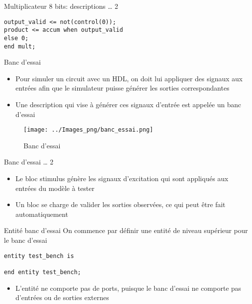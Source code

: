 \documentclass[presentation]{beamer}
\begin{document}
\begin{frame}[label={sec:org9f7edf0},fragile]{Multiplicateur 8 bits: descriptions \ldots{} 2}
 \begin{verbatim}
output_valid <= not(control(0));
product <= accum when output_valid
else 0;
end mult;
\end{verbatim}
\end{frame}

\begin{frame}[label={sec:org7e73c3e}]{Banc d'essai}
\begin{itemize}
\item Pour simuler un circuit avec un HDL, on doit lui appliquer des signaux aux entrées afin que le simulateur puisse générer les sorties correspondantes
\item Une description qui vise à générer ces signaux d'entrée est appelée un \alert{banc d'essai}
\end{itemize}

\begin{figure}[htbp]
\centering
\texttt{[image: ../Images\_png/banc\_essai.png]}
\caption{\label{fig:orgb7308f6}Banc d'essai}
\end{figure}
\end{frame}

\begin{frame}[label={sec:orgccf0895}]{Banc d'essai \ldots{} 2}
\begin{itemize}
\item Le bloc stimulus génère les signaux d'excitation qui sont appliqués aux entrées du modèle à tester
\item Un bloc se charge de valider les sorties observées, ce qui peut être fait automatiquement
\end{itemize}
\end{frame}

\begin{frame}[label={sec:org1dc1b18},fragile]{Entité banc d'essai}
 On commence par définir une entité de niveau supérieur pour le banc d'essai

\begin{verbatim}
entity test_bench is

end entity test_bench;
\end{verbatim}

\begin{itemize}
\item L'entité ne comporte pas de ports, puisque le banc d'essai ne comporte pas d'entrées ou de sorties externes
\end{itemize}
\end{frame}
\end{document}

